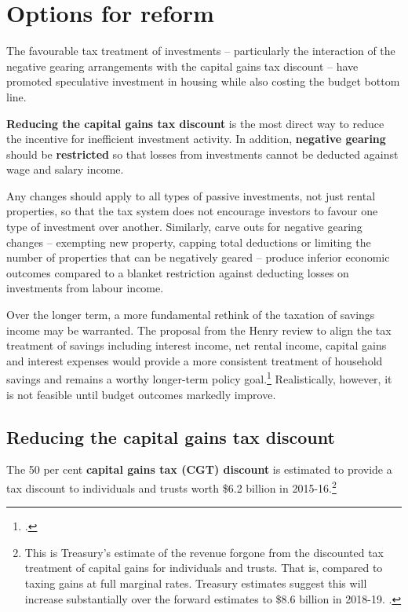 \documentclass{grattanAlpha}\usepackage[]{graphicx}\usepackage[]{color}
\begin{document}
\chapter{Options for reform}\label{chapter:options-for-reform}
The favourable tax treatment of investments -- particularly the interaction of the negative gearing arrangements with the capital gains tax discount -- have promoted speculative investment in housing while also costing the budget bottom line. 

\textbf{Reducing the capital gains tax discount} is the most direct way to reduce the incentive for inefficient investment activity. 
In addition, \textbf{negative gearing} should be \textbf{restricted} so that losses from investments cannot be deducted against wage and salary income. 

Any changes should apply to all types of passive investments, not just rental properties, so that the tax system does not encourage investors to favour one type of investment over another. 
Similarly, carve outs for negative gearing changes – exempting new property, capping total deductions or limiting the number of properties that can be negatively geared – produce inferior economic outcomes compared to a blanket restriction against deducting losses on investments from labour income.

Over the longer term, a more fundamental rethink of the taxation of savings income may be warranted. The proposal from the Henry review to align the tax treatment of savings including interest income, net rental income, capital gains and interest expenses would provide a more consistent treatment of household savings and remains a worthy longer-term policy goal.\footcite[][62--75]{HenryTaxReview2010} Realistically, however, it is not feasible until budget outcomes markedly improve.

\section{Reducing the capital gains tax discount}
The 50 per cent \textbf{capital gains tax (CGT) discount} is estimated to provide a tax discount to individuals and trusts worth \$6.2 billion in 2015-16.\footnote{This is Treasury’s estimate of the revenue forgone from the discounted tax treatment of capital gains for individuals and trusts. That is, compared to taxing gains at full marginal rates. Treasury estimates suggest this will increase substantially over the forward estimates to \$8.6 billion in 2018-19. \textcite[][4--21]{Treasury2016TES}.}   
\end{document}
